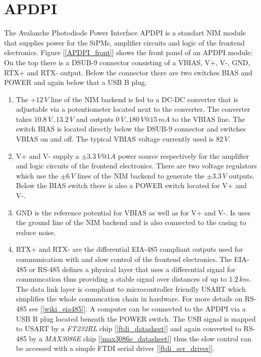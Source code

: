 \documentclass[a4paper, 12pt]{article}
\begin{document}
	\section{APDPI}

The Avalanche Photodiode Power Interface APDPI is a standart NIM module that supplies power for the SiPMs, amplifier circuits and logic of the frontend electronics.
Figure [\ref{APDPI_front}] shows the front panel of an APDPI module: On the top there is a DSUB-9 connector consisting of a VBIAS, V+, V-, GND, RTX+ and RTX- output.
Below the connector there are two switches BIAS and POWER and again below that a USB B plug.

		\begin{enumerate}

			\item The $+12\,V$ line of the NIM backend is fed to a DC-DC converter that is adjustable via a potentiometer located next to the converter.
			The converter takes $10.8\,V .. 13.2\,V$ and outputs $0\,V .. 180\,V@15\,mA$ to the VBIAS line. The switch BIAS is located directly below the DSUB-9 connector
			and switches VBIAS on and off. The typical VBIAS voltage currently used is $82\,V$.

			\item V+ and V- supply a $\pm3.3\,V@1A$ power source respectively for the amplifier and logic circuits of the frontend electronics. There are two voltage regulators 
			which use the $\pm6\,V$ lines of the NIM backend to generate the $\pm3.3\,V$ outputs. Below the BIAS switch there is also a POWER switch located for V+ and V-.

			\item GND is the reference potential for VBIAS as well as for V+ and V-. Is uses the ground line of the NIM backend and is also connected to the casing to reduce noise.

			\item RTX+ and RTX- are the differential EIA-485 compliant outputs used for communication with and slow control of the frontend electronics. The EIA-485 or RS-485 defines a 
				physical layer that uses a differential signal for communcation thus providing a stable signal over distances of up to $1.2\,km$. The data link layer is 
			compliant to microcontroller friendly USART which simplifies the whole commucation chain in hardware. For more details on RS-485 see [\ref{wiki_eia485}]. A 
			computer can be connected to the APDPI via a USB B plug located beneath the POWER switch. The USB signal is mapped to USART by a \emph{FT232RL} chip [\ref{ftdi_datasheet}] 
			and again converted to RS-485 by a \emph{MAX3086E} chip [\ref{max3086e_datasheet}] thus the slow control can be accessed with a simple FTDI serial driver [\ref{ftdi_ser_driver}].
		
		\end{enumerate}
\end{document}
